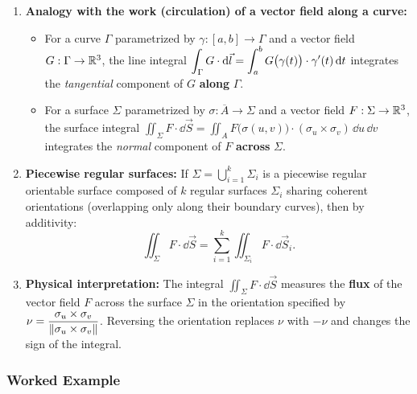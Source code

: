 \begin{remarque}
\begin{enumerate}[label=\textbf{\alph*)}]
    \item \textbf{Analogy with the work (circulation) of a vector field along a curve:}
    \begin{itemize}
        \item For a curve $\Gamma$ parametrized by $\gamma : [a,b] \to \Gamma$ and a vector field $G : \Gamma \to \mathbb{R}^3$, the line integral $\displaystyle\int_{\Gamma} G \cdot \mathrm{d}\vec{l} = \int_{a}^{b} G\big(\gamma(t)\big) \cdot \gamma'(t) \,\mathrm{d}t$ integrates the \emph{tangential} component of $G$ \textbf{along} $\Gamma$.
        \item For a surface $\Sigma$ parametrized by $\sigma : \overline{A} \to \Sigma$ and a vector field $F : \Sigma \to \mathbb{R}^3$, the surface integral $\displaystyle\iint_{\Sigma} F \cdot \dd\vec{S} = \iint_{A} F\big(\sigma(u,v)\big) \cdot (\sigma_u \times \sigma_v) \,\dd u\,\dd v$ integrates the \emph{normal} component of $F$ \textbf{across} $\Sigma$.
    \end{itemize}
    \item \textbf{Piecewise regular surfaces:} If $\Sigma = \bigcup_{i=1}^{k} \Sigma_i$ is a piecewise regular orientable surface composed of $k$ regular surfaces $\Sigma_i$ sharing coherent orientations (overlapping only along their boundary curves), then by additivity:
    \[
        \iint_{\Sigma} F \cdot \dd\vec{S} = \sum_{i=1}^{k} \iint_{\Sigma_i} F \cdot \dd\vec{S}_i.
    \]
    \item \textbf{Physical interpretation:} The integral $\displaystyle\iint_{\Sigma} F \cdot \dd\vec{S}$ measures the \textbf{flux} of the vector field $F$ across the surface $\Sigma$ in the orientation specified by $\nu = \dfrac{\sigma_u \times \sigma_v}{\left\lVert\sigma_u \times \sigma_v\right\rVert}$. Reversing the orientation replaces $\nu$ with $-\nu$ and changes the sign of the integral.
\end{enumerate}
\end{remarque}

\subsubsection{Worked Example}

